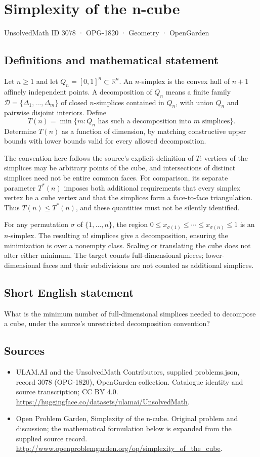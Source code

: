 \documentclass[11pt,a4paper]{article}
\begin{document}
\section*{Simplexity of the n-cube}\label{3078}
{\small UnsolvedMath ID 3078 · OPG-1820 · Geometry · OpenGarden}
\subsection{Definitions and mathematical statement}
Let $n\ge1$ and let $Q_n=[0,1]^n\subset\mathbb R^n$.
An $n$-simplex is the convex hull of $n+1$ affinely independent points.
A decomposition of $Q_n$ means a finite family
$\mathcal D=\{\Delta_1,\ldots,\Delta_m\}$ of closed $n$-simplices
contained in $Q_n$, with union $Q_n$ and pairwise disjoint interiors.
Define
\[
 T(n)=\min\{m:Q_n\text{ has such a decomposition into }m\text{ simplices}\}.
\]
Determine $T(n)$ as a function of dimension, by matching constructive
upper bounds with lower bounds valid for every allowed decomposition.

The convention here follows the source's explicit definition of $T$:
vertices of the simplices may be arbitrary points of the cube, and
intersections of distinct simplices need not be entire common faces.
For comparison, its separate parameter $T^*(n)$ imposes both additional
requirements that every simplex vertex be a cube vertex and that the
simplices form a face-to-face triangulation. Thus $T(n)\le T^*(n)$, and
these quantities must not be silently identified.

For any permutation $\sigma$ of $\{1,\ldots,n\}$, the region
$0\le x_{\sigma(1)}\le\cdots\le x_{\sigma(n)}\le1$ is an $n$-simplex.
The resulting $n!$ simplices give a decomposition, ensuring the minimization
is over a nonempty class. Scaling or translating the cube does not
alter either minimum. The target counts full-dimensional pieces; lower-dimensional
faces and their subdivisions are not counted as additional simplices.
\subsection{Short English statement}
What is the minimum number of full-dimensional simplices needed to decompose a cube, under the source’s unrestricted decomposition convention?
\subsection{Sources}
\begin{itemize}
\item[S1] ULAM.AI and the UnsolvedMath Contributors, supplied problems.json, record 3078 (OPG-1820), OpenGarden collection. Catalogue identity and source transcription; CC BY 4.0.
\url{https://huggingface.co/datasets/ulamai/UnsolvedMath}.
\item[S2] Open Problem Garden, Simplexity of the n-cube. Original problem and discussion; the mathematical formulation below is expanded from the supplied source record.
\url{http://www.openproblemgarden.org/op/simplexity_of_the_cube}.
\end{itemize}
\end{document}
